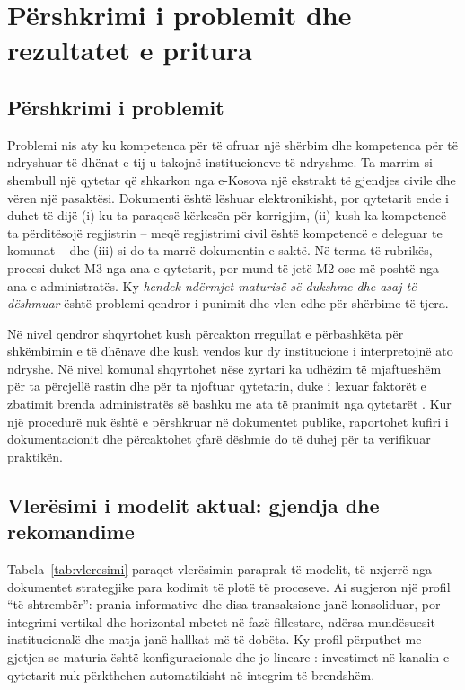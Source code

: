 \documentclass[conference]{IEEEtran}
\begin{document}
\section{Përshkrimi i problemit dhe rezultatet e pritura}
\label{sec:problemi}
\subsection{Përshkrimi i problemit}
Problemi nis aty ku kompetenca për të ofruar një shërbim dhe kompetenca për
të ndryshuar të dhënat e tij u takojnë institucioneve të ndryshme. Ta marrim
si shembull një qytetar që shkarkon nga e-Kosova një ekstrakt të gjendjes
civile dhe vëren një pasaktësi. Dokumenti është lëshuar elektronikisht, por
qytetarit ende i duhet të dijë (i) ku ta paraqesë kërkesën për korrigjim,
(ii) kush ka kompetencë ta përditësojë regjistrin -- meqë regjistrimi civil
është kompetencë e deleguar te komunat \cite{ligji03L040} -- dhe (iii) si do
ta marrë dokumentin e saktë. Në terma të rubrikës, procesi duket M3 nga ana e
qytetarit, por mund të jetë M2 ose më poshtë nga ana e administratës. Ky
\textit{hendek ndërmjet maturisë së dukshme dhe asaj të dëshmuar} është
problemi qendror i punimit dhe vlen edhe për shërbime të tjera.

Në nivel qendror shqyrtohet kush përcakton rregullat e përbashkëta për
shkëmbimin e të dhënave dhe kush vendos kur dy institucione i interpretojnë
ato ndryshe. Në nivel komunal shqyrtohet nëse zyrtari ka udhëzim të
mjaftueshëm për ta përcjellë rastin dhe për ta njoftuar qytetarin, duke i
lexuar faktorët e zbatimit brenda administratës së bashku me ata të pranimit
nga qytetarët \cite{gilgarcia2020}. Kur një
procedurë nuk është e përshkruar në dokumentet publike, raportohet kufiri i
dokumentacionit dhe përcaktohet çfarë dëshmie do të duhej për ta verifikuar
praktikën.

\subsection{Vlerësimi i modelit aktual: gjendja dhe rekomandime}
Tabela~\ref{tab:vleresimi} paraqet vlerësimin paraprak të modelit, të
nxjerrë nga dokumentet strategjike para kodimit të plotë të proceseve. Ai
sugjeron një profil ``të shtrembër'': prania informative dhe disa
transaksione janë konsoliduar, por integrimi vertikal dhe horizontal mbetet
në fazë fillestare, ndërsa mundësuesit institucionalë dhe matja janë hallkat
më të dobëta. Ky profil përputhet me gjetjen se maturia është konfiguracionale
dhe jo lineare \cite{iannacci2025}: investimet në kanalin e qytetarit nuk
përkthehen automatikisht në integrim të brendshëm.
\end{document}
